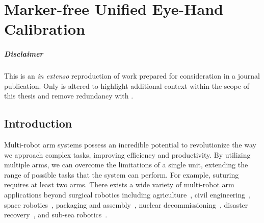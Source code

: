 \graphicspath{{chapter_1}}
\chapter[Marker-free Unified Eye-Hand Calibration]{Marker-free Unified Eye-Hand Calibration}
\label{chap:registration}
\minitoc

\paragraph{Disclaimer} This  is an \textit{in extenso} reproduction of work
prepared
for consideration in a journal publication.
Only  is altered to highlight additional context within the scope of this thesis and remove redundancy with .

\newpage

\section{Introduction}
\label{c1:sec:introduction}
Multi-robot arm systems possess an incredible potential to revolutionize the way we approach complex tasks, improving efficiency and productivity. 
By utilizing multiple arms, we can overcome the limitations of a single unit, extending the range of possible tasks that the system can perform. 
For example, suturing requires at least two arms.
There exists a wide variety of multi-robot arm applications beyond surgical robotics including 
agriculture~\cite{Xiong20}, 
civil engineering~\cite{Yasutomi23}, 
space robotics~\cite{Yan20},
packaging and assembly~\cite{Do12},
nuclear decommissioning~\cite{Mohamed07},
disaster recovery~\cite{Kamezaki16}, and
sub-sea robotics~\cite{Brantner21}.


